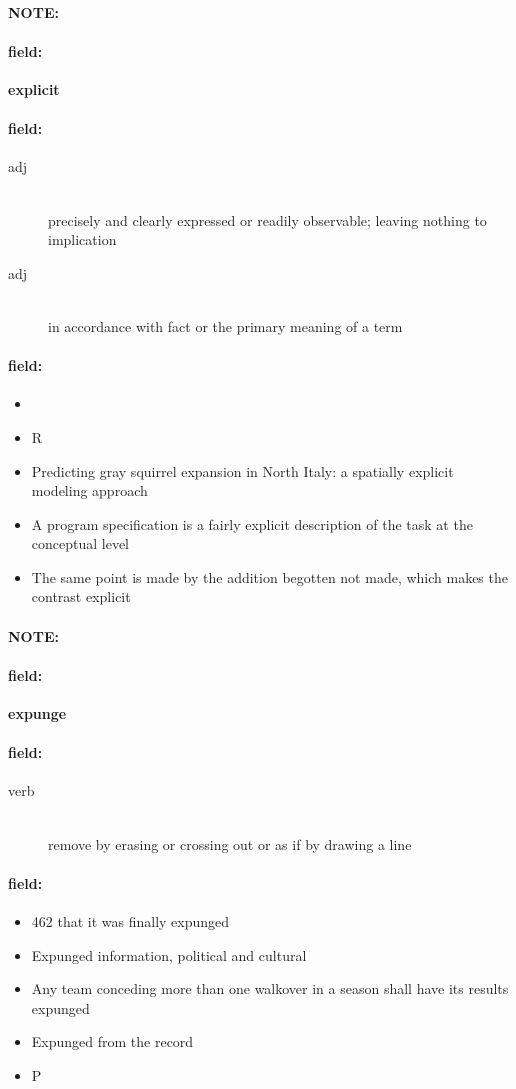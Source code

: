 \documentclass[12pt]{article}
\newenvironment{note}{\paragraph{NOTE:}}{}
\newenvironment{field}{\paragraph{field:}}{}
\begin{document}
\begin{note}
\begin{field}
\textbf{\large explicit}
\end{field}


\begin{field}
\begin{description}
\item[adj] \hfill \\ 
precisely and clearly expressed or readily observable; leaving nothing to implication

\item[adj] \hfill \\ 
in accordance with fact or the primary meaning of a term

\end{description}
\end{field}

\begin{field}
\begin{itemize}
\item 
\item R
\item Predicting gray squirrel expansion in North Italy: a spatially explicit modeling approach
\item A program specification is a fairly explicit description of the task at the conceptual level
\item The same point is made by the addition begotten not made, which makes the contrast explicit
\end{itemize}
\end{field}
\end{note}
\begin{note}
\begin{field}
\textbf{\large expunge}
\end{field}


\begin{field}
\begin{description}
\item[verb] \hfill \\ 
remove by erasing or crossing out or as if by drawing a line

\end{description}
\end{field}

\begin{field}
\begin{itemize}
\item  462 that it was finally expunged
\item Expunged information, political and cultural
\item Any team conceding more than one walkover in a season shall have its results expunged
\item Expunged from the record
\item P
\end{itemize}
\end{field}
\end{note}
\end{document}
